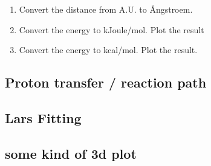 \documentclass{article}
\begin{document}
\begin{enumerate}

    \item Convert the distance from A.U. to \AA ngstroem.

    \item Convert the energy to kJoule/mol. Plot the result

    \item Convert the energy to kcal/mol. Plot the result.

\end{enumerate}




\subsection{Proton transfer / reaction path}



\subsection{Lars Fitting}



\subsection{some kind of 3d plot}








\end{document}

